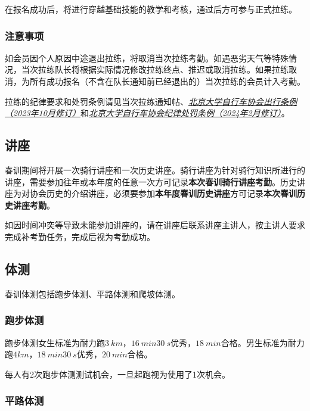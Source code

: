 \documentclass[UTF8]{ctexart}
\begin{document}
在报名成功后，将进行穿越基础技能的教学和考核，通过后方可参与正式拉练。

\subsubsection{注意事项}

如会员因个人原因中途退出拉练，将取消当次拉练考勤。如遇恶劣天气等特殊情况，当次拉练队长将根据实际情况修改拉练终点、推迟或取消拉练。如果拉练取消，为所有成功报名（不含在队长通知前已经退出的）当次拉练的会员计入考勤。


拉练的纪律要求和处罚条例请见当次拉练通知帖、\href{https://chexie.net/bbs/content/?bid=1&tid=9618&p=1}{\textit{北京大学自行车协会出行条例（2023年10月修订）}}和\href{https://chexie.net/bbs/content/?bid=1&tid=9751&p=1}{\textit{北京大学自行车协会纪律处罚条例（2024年2月修订）}}。

\subsection{讲座}


春训期间将开展一次骑行讲座和一次历史讲座。骑行讲座为针对骑行知识所进行的讲座，需要参加往年或本年度的任意一次方可记录\textbf{本次春训骑行讲座考勤}。历史讲座为对协会历史的介绍讲座，必须要参加\textbf{本年度春训历史讲座}方可记录\textbf{本次春训历史讲座考勤}。

如因时间冲突等导致未能参加讲座的，请在讲座后联系讲座主讲人，按主讲人要求完成补考勤任务，完成后视为考勤成功。

\subsection{体测}

春训体测包括跑步体测、平路体测和爬坡体测。

\subsubsection{跑步体测}

跑步体测女生标准为耐力跑$\SI{3}{km}$，$\SI{16}{min}\SI{30}{s}$优秀，$\SI{18}{min}$合格。男生标准为耐力跑$4km$，$\SI{18}{min}\SI{30}{s}$优秀，$\SI{20}{min}$合格。

每人有2次跑步体测测试机会，一旦起跑视为使用了1次机会。

\subsubsection{平路体测}
\end{document}
